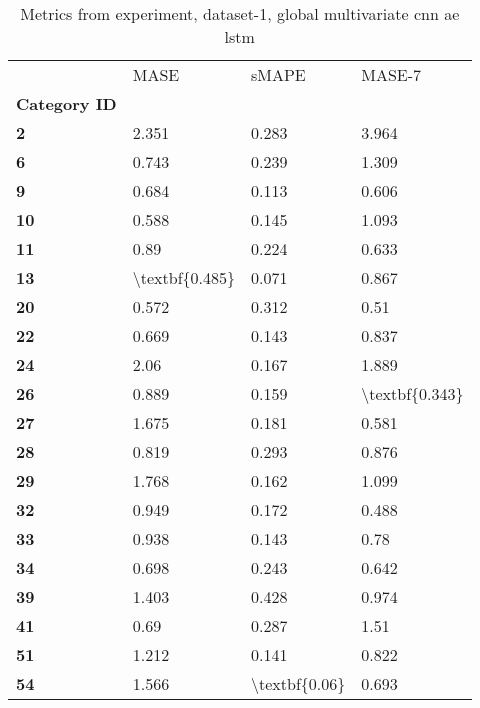 \begin{table}[h]
\centering
\caption{Metrics from experiment, dataset-1, global multivariate cnn ae lstm}
\label{table:global-multivariate-cnn-ae-lstm-dataset-1}
\begin{tabular}{llll}
\toprule
{} &            MASE &          sMAPE &          MASE-7 \\
\textbf{Category ID} &                 &                &                 \\
\midrule
\textbf{2          } &           2.351 &          0.283 &           3.964 \\
\textbf{6          } &           0.743 &          0.239 &           1.309 \\
\textbf{9          } &           0.684 &          0.113 &           0.606 \\
\textbf{10         } &           0.588 &          0.145 &           1.093 \\
\textbf{11         } &            0.89 &          0.224 &           0.633 \\
\textbf{13         } &  \textbackslash textbf\{0.485\} &          0.071 &           0.867 \\
\textbf{20         } &           0.572 &          0.312 &            0.51 \\
\textbf{22         } &           0.669 &          0.143 &           0.837 \\
\textbf{24         } &            2.06 &          0.167 &           1.889 \\
\textbf{26         } &           0.889 &          0.159 &  \textbackslash textbf\{0.343\} \\
\textbf{27         } &           1.675 &          0.181 &           0.581 \\
\textbf{28         } &           0.819 &          0.293 &           0.876 \\
\textbf{29         } &           1.768 &          0.162 &           1.099 \\
\textbf{32         } &           0.949 &          0.172 &           0.488 \\
\textbf{33         } &           0.938 &          0.143 &            0.78 \\
\textbf{34         } &           0.698 &          0.243 &           0.642 \\
\textbf{39         } &           1.403 &          0.428 &           0.974 \\
\textbf{41         } &            0.69 &          0.287 &            1.51 \\
\textbf{51         } &           1.212 &          0.141 &           0.822 \\
\textbf{54         } &           1.566 &  \textbackslash textbf\{0.06\} &           0.693 \\
\bottomrule
\end{tabular}
\end{table}
